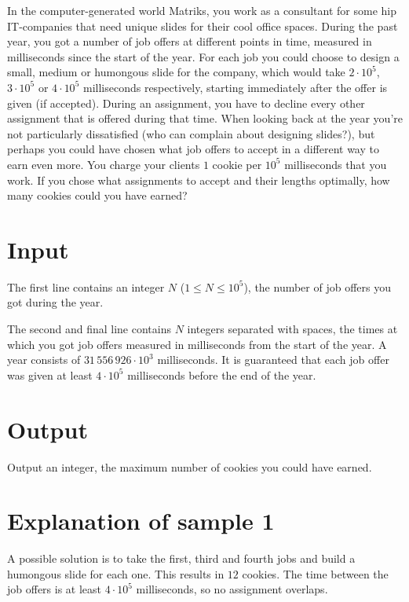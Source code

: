 In the computer-generated world Matriks, you work as a consultant for some hip IT-companies that need unique slides for their cool office spaces.
During the past year, you got a number of job offers at different points in time, measured in milliseconds since the start of the year.
For each job you could choose to design a small, medium or humongous slide for the company, which would take $2 \cdot 10^5$, $3 \cdot 10^5$ or $4 \cdot 10^5$ milliseconds respectively, starting immediately after the offer is given (if accepted).
During an assignment, you have to decline every other assignment that is offered during that time.
When looking back at the year you're not particularly dissatisfied (who can complain about designing slides?), but perhaps you could have chosen what job offers to accept in a different way to earn even more.
You charge your clients $1$ cookie per $10^5$ milliseconds that you work.
If you chose what assignments to accept and their lengths optimally, how many cookies could you have earned?

\section*{Input}
The first line contains an integer $N$ ($1 \le N \le 10^5$), the number of job offers you got during the year.

The second and final line contains $N$ integers separated with spaces, the times at which you got job offers measured in milliseconds from the start of the year.
A year consists of $31\,556\,926 \cdot 10^3$ milliseconds.
It is guaranteed that each job offer was given at least $4 \cdot 10^5$ milliseconds before the end of the year.

\section*{Output}
Output an integer, the maximum number of cookies you could have earned.

\section*{Explanation of sample 1}
A possible solution is to take the first, third and fourth jobs and build a humongous slide for each one.
This results in $12$ cookies.
The time between the job offers is at least $4 \cdot 10^5$ milliseconds, so no assignment overlaps.
